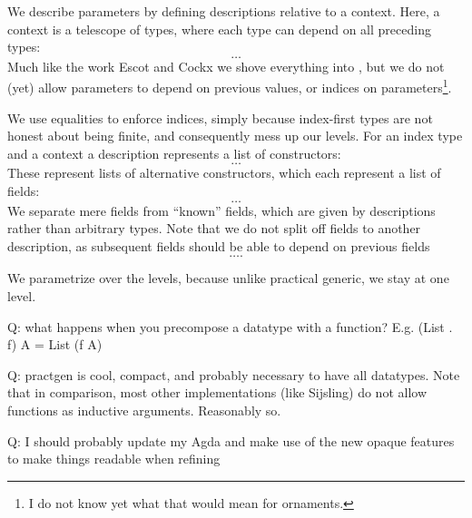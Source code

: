 We describe parameters by defining descriptions relative to a context. Here, a context is a telescope of types, where each type can depend on all preceding types:
\[ \dots \]
Much like the work Escot and Cockx \cite{practgen} we shove everything into , but we do not (yet) allow parameters to depend on previous values, or indices on parameters\footnote{I do not know yet what that would mean for ornaments.}.

We use equalities to enforce indices, simply because index-first types are not honest about being finite, and consequently mess up our levels. For an index type and a context a description represents a list of constructors:
\[ \dots \]
These represent lists of alternative constructors, which each represent a list of fields:
\[ \dots \]
We separate mere fields from ``known'' fields, which are given by descriptions rather than arbitrary types. Note that we do not split off fields to another description, as subsequent fields should be able to depend on previous fields
\[ \dots. \]


We parametrize over the levels, because unlike practical generic, we stay at one level.

Q: what happens when you precompose a datatype with a function? E.g. (List . f) A = List (f A) 

Q: practgen is cool, compact, and probably necessary to have all datatypes. Note that in comparison, most other implementations (like Sijsling) do not allow functions as inductive arguments. Reasonably so.

Q: I should probably update my Agda and make use of the new opaque features to make things readable when refining
